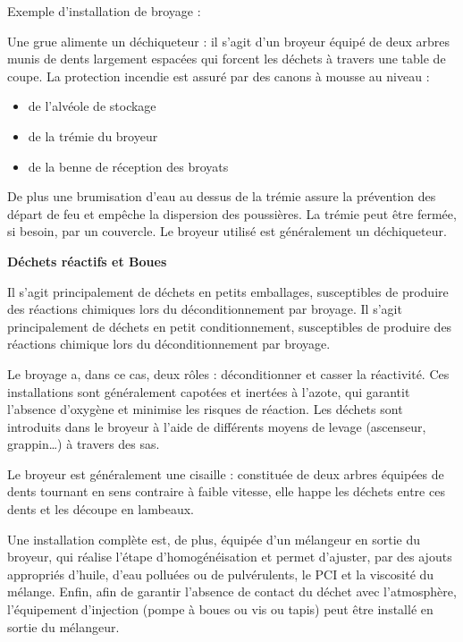 Exemple d’installation de broyage :
\vspace{0.3cm}

Une grue alimente un déchiqueteur : il s’agit d’un broyeur équipé de deux arbres munis de dents largement espacées qui forcent les déchets à travers une table de coupe.
La protection incendie est assuré par des canons à mousse au niveau :

\begin{itemize}
\item	de l’alvéole de stockage
\item de la trémie du broyeur
\item de la benne de réception des broyats
\end{itemize}

De plus une brumisation d’eau au dessus de la trémie assure la prévention des départ de feu et empêche la dispersion des poussières. La trémie peut être fermée, si besoin, par un couvercle.
Le broyeur utilisé est généralement un déchiqueteur.

\vspace{0.3cm}
\textbf{Déchets réactifs et Boues}
\vspace{0.3cm}

Il s'agit principalement de déchets en petits emballages, susceptibles de produire des réactions chimiques lors du déconditionnement par broyage.
Il s’agit principalement de déchets en petit conditionnement, susceptibles de produire des réactions chimique lors du déconditionnement par broyage.

\vspace{0.3cm}

Le broyage a, dans ce cas, deux rôles : déconditionner et casser la réactivité.
Ces installations sont généralement capotées et inertées à l’azote, qui garantit l’absence d’oxygène et minimise les risques de réaction. Les déchets sont introduits dans le broyeur à l’aide de différents moyens de levage (ascenseur, grappin…) à travers des sas.
\vspace{0.3cm}

Le broyeur est généralement une cisaille : constituée de deux arbres équipées de dents tournant en sens contraire à faible vitesse, elle happe les déchets entre ces dents et les découpe en lambeaux.
\vspace{0.3cm}

Une installation complète est, de plus, équipée d’un mélangeur en sortie du broyeur, qui réalise l’étape d’homogénéisation et permet d’ajuster, par des ajouts appropriés d’huile, d’eau polluées ou de pulvérulents, le PCI et la viscosité du mélange.
Enfin, afin de garantir l’absence de contact du déchet avec l’atmosphère, l’équipement d’injection (pompe à boues ou vis ou tapis) peut être installé en sortie du mélangeur.
\vspace{0.3cm}

